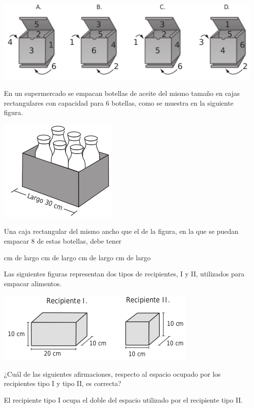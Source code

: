 \documentclass[10pt,letterpaper,addpoints]{exam}
\begin{document}
\begin{multicols}{2}
\begin{questions}
\begin{center}
 \includegraphics[scale=.45]{Images/Pantallazo-4.png} 
 \end{center}
 \question En un supermercado se empacan botellas de aceite del mismo tamaño en cajas rectangulares con capacidad para 6 botellas, como se muestra en la siguiente figura.
 \begin{center}
 \includegraphics[scale=.6]{Images/Pantallazo-5.png} 
 \end{center}
 Una caja rectangular del mismo ancho que el de la figura, en la que se puedan empacar 8 de estas botellas, debe tener
 \begin{choices}
  cm de largo
  cm de largo
  cm de largo
  cm de largo
 \end{choices}
 \question Las siguientes figuras representan dos tipos de recipientes, I y II, utilizados para empacar alimentos.
 \begin{center}
 \includegraphics[scale=.6]{Images/Pantallazo-6.png} 
 \end{center}
 ¿Cuál de las siguientes afirmaciones, respecto al espacio ocupado por los recipientes tipo I y tipo II, es correcta?
 \begin{choices}
 \CorrectChoice El recipiente tipo I ocupa el doble del espacio utilizado por el recipiente tipo II.

\end{choices}
\end{questions}
\end{multicols}
\end{document}

